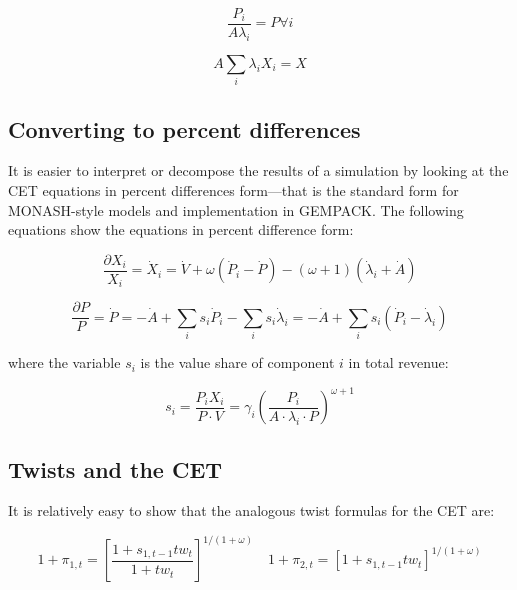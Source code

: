 \begin{displaymath}
\frac{{{P}_{i}}}{A{{\lambda }_{i}}}=P\forall i
\end{displaymath}

\begin{displaymath}
A\sum\limits_{i}{{{\lambda }_{i}}{{X}_{i}}}=X
\end{displaymath}

\subsection{Converting to percent differences}

It is easier to interpret or decompose the results of a simulation by looking at the CET equations in
percent differences form---that is the standard form for MONASH-style models and implementation
in GEMPACK. The following equations show the equations in percent difference form:

\begin{displaymath}
\frac{\partial X_i}{X_i} = \dot{X}_i = \dot{V} + \omega \left(\dot{P}_i - \dot{P} \right)
- \left( \omega+1 \right) \left(\dot{\lambda}_i + \dot{A} \right)
\end{displaymath}

\begin{displaymath}
\frac{\partial P}{P} = \dot{P} = -\dot{A} + \sum_i{s_i \dot{P}_i} - \sum_i{s_i \dot{\lambda}_i}
= -\dot{A} + \sum_i{s_i \left(\dot{P}_i - \dot{\lambda}_i\right)}
\end{displaymath}

\noindent where the variable $s_i$ is the value share of component $i$ in total revenue:

\begin{displaymath}
s_i = \frac{P_i X_i}{P \cdot V}
= \gamma_i \left( \frac{P_i}{A \cdot \lambda_i \cdot P} \right)^{\omega + 1}
\end{displaymath}

\subsection{Twists and the CET}

It is relatively easy to show that the analogous twist formulas
for the CET are:

\begin{displaymath}
1+\pi_{1,t} =
\left[
\frac{1+s_{1,t-1}\mathit{tw_t}}{1+\mathit{tw_t}}
\right]^{1/(1+\omega)}
\quad
1+\pi_{2,t} = \left[
{1+s_{1,t-1}\mathit{tw_t}}
\right]^{1/(1+\omega)}
\end{displaymath}

